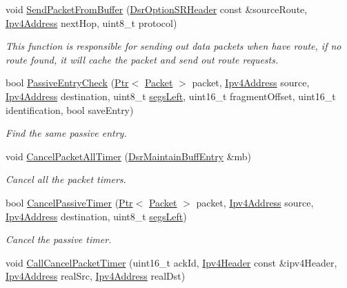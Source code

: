 \begin{DoxyCompactItemize}
void \hyperlink{classns3_1_1dsr_1_1DsrRouting_a1a862a16f3a5527f9425763864ac3e80}{Send\+Packet\+From\+Buffer} (\hyperlink{classns3_1_1dsr_1_1DsrOptionSRHeader}{Dsr\+Option\+S\+R\+Header} const \&source\+Route, \hyperlink{classns3_1_1Ipv4Address}{Ipv4\+Address} next\+Hop, uint8\+\_\+t protocol)
\begin{DoxyCompactList}\small\item\em This function is responsible for sending out data packets when have route, if no route found, it will cache the packet and send out route requests. \end{DoxyCompactList}\item 
bool \hyperlink{classns3_1_1dsr_1_1DsrRouting_aa2c72a1da3112a21f199ebe9dbc18110}{Passive\+Entry\+Check} (\hyperlink{classns3_1_1Ptr}{Ptr}$<$ \hyperlink{classns3_1_1Packet}{Packet} $>$ packet, \hyperlink{classns3_1_1Ipv4Address}{Ipv4\+Address} source, \hyperlink{classns3_1_1Ipv4Address}{Ipv4\+Address} destination, uint8\+\_\+t \hyperlink{classns3_1_1dsr_1_1DsrRouting_a2089307bfbe378b6cd8b274b38f70bb9}{segs\+Left}, uint16\+\_\+t fragment\+Offset, uint16\+\_\+t identification, bool save\+Entry)
\begin{DoxyCompactList}\small\item\em Find the same passive entry. \end{DoxyCompactList}\item 
void \hyperlink{classns3_1_1dsr_1_1DsrRouting_afb3145517b31e5a0e2016ac496c86050}{Cancel\+Packet\+All\+Timer} (\hyperlink{classns3_1_1dsr_1_1DsrMaintainBuffEntry}{Dsr\+Maintain\+Buff\+Entry} \&mb)
\begin{DoxyCompactList}\small\item\em Cancel all the packet timers. \end{DoxyCompactList}\item 
bool \hyperlink{classns3_1_1dsr_1_1DsrRouting_a2d33e2373aafc398451aa081c44c699a}{Cancel\+Passive\+Timer} (\hyperlink{classns3_1_1Ptr}{Ptr}$<$ \hyperlink{classns3_1_1Packet}{Packet} $>$ packet, \hyperlink{classns3_1_1Ipv4Address}{Ipv4\+Address} source, \hyperlink{classns3_1_1Ipv4Address}{Ipv4\+Address} destination, uint8\+\_\+t \hyperlink{classns3_1_1dsr_1_1DsrRouting_a2089307bfbe378b6cd8b274b38f70bb9}{segs\+Left})
\begin{DoxyCompactList}\small\item\em Cancel the passive timer. \end{DoxyCompactList}\item 
void \hyperlink{classns3_1_1dsr_1_1DsrRouting_a720cc99dcbb0bc42539f0cab37018ae6}{Call\+Cancel\+Packet\+Timer} (uint16\+\_\+t ack\+Id, \hyperlink{classns3_1_1Ipv4Header}{Ipv4\+Header} const \&ipv4\+Header, \hyperlink{classns3_1_1Ipv4Address}{Ipv4\+Address} real\+Src, \hyperlink{classns3_1_1Ipv4Address}{Ipv4\+Address} real\+Dst)

\end{DoxyCompactItemize}
